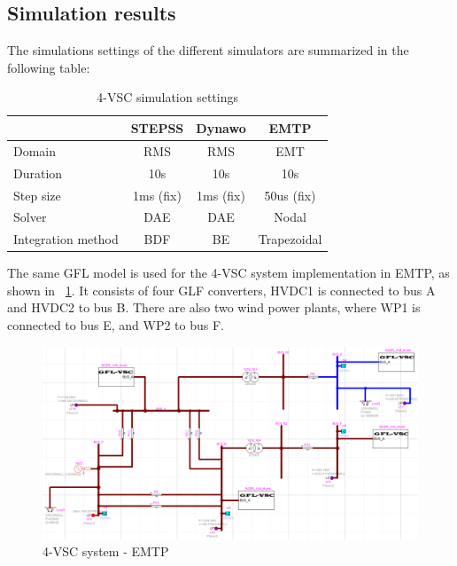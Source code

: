 \documentclass{report}
\begin{document}
\subsection{Simulation results}
The simulations settings of the different simulators are summarized in the following table:

\begin{table}[H]
\centering
\caption{4-VSC simulation settings}
\begin{tabular}{lccc}
\hline
                   & \textbf{STEPSS}                  & \textbf{Dynawo} & \textbf{EMTP} \\ \hline
Domain             & RMS                              & RMS             & EMT           \\ \hline
Duration           & 10s                              & 10s             & 10s           \\ \hline
Step size          & 1ms (fix)                        & 1ms (fix)       & 50us (fix)    \\ \hline
Solver             & DAE                              & DAE             & Nodal         \\ \hline
Integration method & BDF & BE  & Trapezoidal   \\ \hline
\end{tabular}
\label{4VSC_simulation_params}
\end{table}

The same GFL model is used for the 4-VSC system implementation in EMTP, as shown in \figurename~\ref{4VSC_system_EMTP}. It consists of four GLF converters, HVDC1 is connected to bus A and HVDC2 to bus B. There are also two wind power plants, where WP1 is connected to bus E, and WP2 to bus F.
\begin{figure}[H]
    \centering
    \includegraphics[scale = 0.4]{Figure_4VSC/4VSC_system_EMTP.png}
    \caption{4-VSC system - EMTP}
    \label{4VSC_system_EMTP}
\end{figure}
\end{document}
